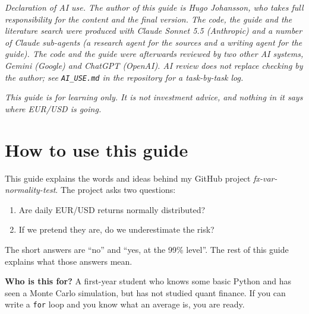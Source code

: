 \documentclass[11pt,a4paper]{article}
\newcommand{\code}[1]{\texttt{#1}}
\begin{document}
\begin{titlepage}
    \vfill

    \begin{minipage}{0.85\textwidth}
        \centering
        \scriptsize \textit{Declaration of AI use. The author of this guide is
        Hugo Johansson, who takes full responsibility for the content and the
        final version. The code, the guide and the literature search were
        produced with Claude Sonnet 5.5 (Anthropic) and a number of Claude
        sub-agents (a research agent for the sources and a writing agent for
        the guide). The code and the guide were afterwards reviewed by two
        other AI systems, Gemini (Google) and ChatGPT (OpenAI). AI review
        does not replace checking by the author; see \texttt{AI\_USE.md} in
        the repository for a task-by-task log.}
    \end{minipage}
\end{titlepage}

\thispagestyle{empty}
\newpage
\setcounter{page}{1}

\begin{center}
\small\itshape This guide is for learning only. It is not investment advice,
and nothing in it says where EUR/USD is going.
\end{center}

\tableofcontents
\newpage

\section{How to use this guide}

This guide explains the words and ideas behind my GitHub project
\emph{fx-var-normality-test}. The project asks two questions:

\begin{enumerate}
  \item Are daily EUR/USD returns normally distributed?
  \item If we pretend they are, do we underestimate the risk?
\end{enumerate}

The short answers are ``no'' and ``yes, at the 99\% level''. The rest of
this guide explains what those answers mean.

\textbf{Who is this for?} A first-year student who knows some basic Python
and has seen a Monte Carlo simulation, but has not studied quant finance.
If you can write a \code{for} loop and you know what an average is, you are
ready.
\end{document}
